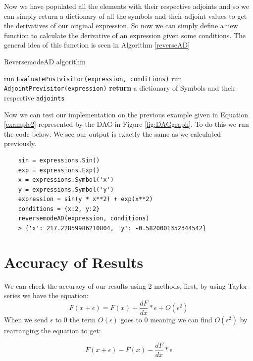 \documentclass{article}
\begin{document}
Now we have populated all the elements with their respective adjoints and so we can simply return a dictionary of all the symbols and their adjoint values to get the derivatives of our original expression. So now we can simply define a new function to calculate the derivative of an expression given some conditions. The general idea of this function is seen in Algorithm \ref{reverseAD}

\begin{algorithm}[h]
\caption{ReversemodeAD algorithm}\label{reverseAD}
\begin{algorithmic}[1]
\State run \verb|EvaluatePostvisitor(expression, conditions)|
\State run \verb|AdjointPrevisitor(expression)|
\State \textbf{return} a dictionary of Symbols and their respective \verb|adjoints|
\EndProcedure
\end{algorithmic}
\end{algorithm}

Now we can test our implementation on the previous example given in Equation \ref{example2} represented by the DAG in Figure \ref{fig:DAGgraph}. To do this we run the code below. We see our output is exactly the same as we calculated previously.

\begin{verbatim}
    sin = expressions.Sin()
    exp = expressions.Exp()
    x = expressions.Symbol('x')
    y = expressions.Symbol('y')
    expression = sin(y * x**2) + exp(x**2)
    conditions = {x:2, y:2}
    reversemodeAD(expression, conditions)
    > {'x': 217.22859986210804, 'y': -0.5820001352344542}
\end{verbatim}



\section{Accuracy of Results}

We can check the accuracy of our results using 2 methods, first, by using Taylor series we have the equation:
\begin{equation}
    F(x + \epsilon) = F(x) + \frac{dF}{dx} * \epsilon + O(\epsilon ^ 2)
\end{equation}
When we send $\epsilon$ to 0 the term $O(\epsilon)$ goes to 0 meaning we can find $O(\epsilon^2)$ by rearranging the equation to get:

\begin{equation}
    F(x + \epsilon) - F(x) - \frac{dF}{dx} * \epsilon
\end{equation}
\end{document}
